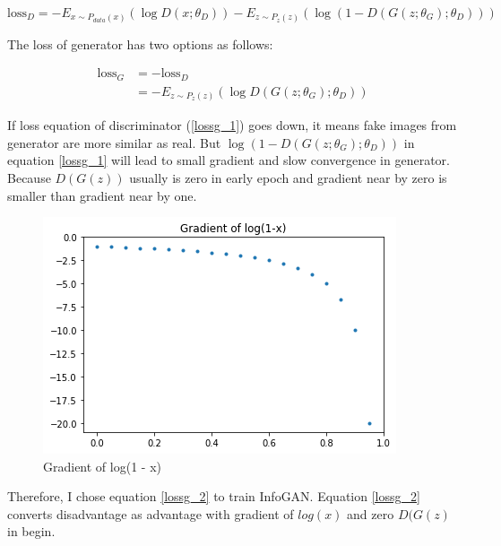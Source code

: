 \documentclass[12pt]{article}
\begin{document}
\begin{equation}
\label{lossd}
    \text{loss}_D = -E_{x\sim P_{data}(x) }(\log D(x;\theta_D)) - E_{z\sim P_{z}(z)}(\log(1 - D(G(z; \theta_G); \theta_D)))
\end{equation}

The loss of generator has two options as follows:

\begin{align}
\label{lossg_1}
    \text{loss}_G & = -\text{loss}_D \\
\label{lossg_2}
    & = -E_{z\sim P_z(z)}(\log D(G(z; \theta_G); \theta_D) )
\end{align}

If loss equation of discriminator (\ref{lossg_1}) goes down, it means fake images from generator are more similar as real. But $\log (1 - D(G(z; \theta_G); \theta_D))$ in equation \ref{lossg_1} will lead to small gradient and slow convergence in generator. Because $D(G(z))$ usually is zero in early epoch and gradient near by zero is smaller than gradient near by one.

\begin{figure}[H]
\centering
\includegraphics[width=\linewidth]{Images/gradientlog.png}
\caption{Gradient of log(1 - x)}
\end{figure}

Therefore, I chose equation \ref{lossg_2} to train InfoGAN. Equation \ref{lossg_2} converts disadvantage as advantage with gradient of $log(x)$ and zero $D(G(z)$ in begin.
\end{document}
